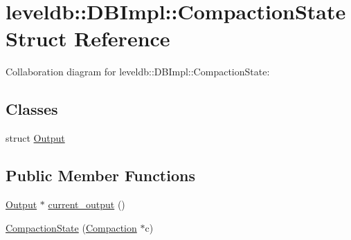 \hypertarget{structleveldb_1_1_d_b_impl_1_1_compaction_state}{\section{leveldb\-:\-:D\-B\-Impl\-:\-:Compaction\-State Struct Reference}
\label{structleveldb_1_1_d_b_impl_1_1_compaction_state}
}


Collaboration diagram for leveldb\-:\-:D\-B\-Impl\-:\-:Compaction\-State\-:
\subsection*{Classes}
\begin{DoxyCompactItemize}
\item 
struct \hyperlink{structleveldb_1_1_d_b_impl_1_1_compaction_state_1_1_output}{Output}
\end{DoxyCompactItemize}
\subsection*{Public Member Functions}
\begin{DoxyCompactItemize}
\item 
\hyperlink{structleveldb_1_1_d_b_impl_1_1_compaction_state_1_1_output}{Output} $\ast$ \hyperlink{structleveldb_1_1_d_b_impl_1_1_compaction_state_ac371d4a1422f4c1c122cfd39e97a6b95}{current\-\_\-output} ()
\item 
\hyperlink{structleveldb_1_1_d_b_impl_1_1_compaction_state_a3f66a31afd7f73ef5021337d1ec626b6}{Compaction\-State} (\hyperlink{classleveldb_1_1_compaction}{Compaction} $\ast$c)
\end{DoxyCompactItemize}
